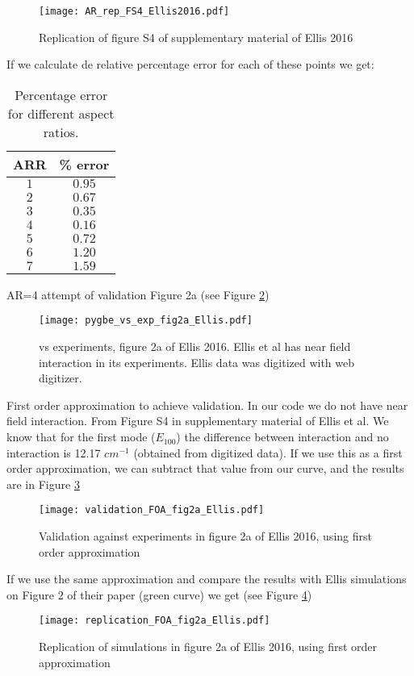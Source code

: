 \begin{figure}
    \centering
    \texttt{[image: AR\_rep\_FS4\_Ellis2016.pdf]} 
    \caption{Replication of figure S4 of supplementary material of Ellis 2016}
    \label{fig:rep_FS4_ellis}
 \end{figure}

 If we calculate de relative percentage error for each of these points we get:
 
 \begin{table}
    \centering
    \caption{\label{table:err_AR} Percentage error for different aspect ratios.} 
    \begin{tabular}{c c}
    \hline%
    ARR & \% error \\
    \hline%
     $1$ & $0.95$ \\
     $2$ & $0.67$ \\
     $3$ & $0.35$ \\
     $4$ & $0.16$ \\
     $5$ & $0.72$ \\
     $6$ & $1.20$ \\
     $7$ & $1.59$ \\
    \hline%
    \end{tabular}
\end{table}


\pygbe AR=4 attempt of validation Figure 2a (see Figure \ref{fig:pygbe_vs_exp_2a})

\begin{figure}
    \centering
    \texttt{[image: pygbe\_vs\_exp\_fig2a\_Ellis.pdf]} 
    \caption{\pygbe vs experiments, figure 2a of Ellis 2016. Ellis et al 
    has near field interaction in its experiments. Ellis data was digitized
    with web digitizer.}
    \label{fig:pygbe_vs_exp_2a}
 \end{figure}

First order approximation to achieve validation. In our code we do not have near 
field interaction. From Figure S4 in supplementary material of Ellis et al. We know that 
for the first mode ($E_{100}$) the difference between interaction and no interaction is 
12.17 $cm^{-1}$ (obtained from digitized data). If we use this as a first order approximation,
we can subtract that value from our curve, and the results are in Figure \ref{fig:val_2a}

\begin{figure}
    \centering
    \texttt{[image: validation\_FOA\_fig2a\_Ellis.pdf]} 
    \caption{Validation against experiments in figure 2a of Ellis 2016, using first order approximation}
    \label{fig:val_2a}
 \end{figure}

If we use the same approximation and compare the results with Ellis simulations on
Figure 2 of their paper (green curve) we get (see Figure \ref{fig:rep_2a})

\begin{figure}
    \centering
    \texttt{[image: replication\_FOA\_fig2a\_Ellis.pdf]} 
    \caption{Replication of simulations in figure 2a of Ellis 2016, using first
     order approximation}
    \label{fig:rep_2a}
 \end{figure}